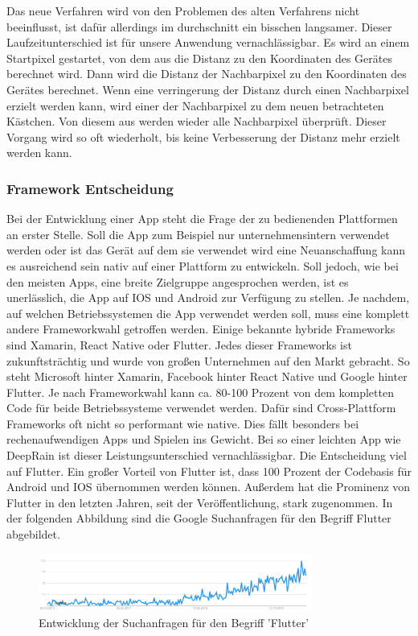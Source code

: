  \noindent 
 Das neue Verfahren wird von den Problemen des alten Verfahrens nicht beeinflusst, ist dafür allerdings im durchschnitt ein bisschen langsamer. 
 Dieser Laufzeitunterschied ist für unsere Anwendung vernachlässigbar. 
 Es wird an einem Startpixel gestartet, von dem aus die Distanz zu den Koordinaten des Gerätes berechnet wird. 
 Dann wird die Distanz der Nachbarpixel zu den Koordinaten des Gerätes berechnet. 
 Wenn eine verringerung der Distanz durch einen Nachbarpixel erzielt werden kann, wird einer der Nachbarpixel zu dem neuen betrachteten Kästchen. 
 Von diesem aus werden wieder alle Nachbarpixel überprüft. 
 Dieser Vorgang wird so oft wiederholt, bis keine Verbesserung der Distanz mehr erzielt werden kann.

\subsubsection{Framework Entscheidung}\label{framework entscheidung}
Bei der Entwicklung einer App steht die Frage der zu bedienenden Plattformen an erster Stelle. Soll die App zum Beispiel nur unternehmensintern verwendet 
werden oder ist das Gerät auf dem sie verwendet wird eine Neuanschaffung kann es ausreichend sein nativ auf einer Plattform zu entwickeln. Soll jedoch, 
wie bei den meisten Apps, eine breite Zielgruppe angesprochen werden, ist es unerlässlich, die App auf IOS und Android zur Verfügung zu stellen. 
Je nachdem, auf welchen Betriebssystemen die App verwendet werden soll, muss eine komplett andere Frameworkwahl getroffen werden. 
Einige bekannte hybride Frameworks sind Xamarin, React Native oder Flutter. Jedes dieser Frameworks ist zukunftsträchtig und wurde von großen 
Unternehmen auf den Markt gebracht. So steht Microsoft hinter Xamarin, Facebook hinter React Native und Google hinter Flutter. 
Je nach Frameworkwahl kann ca. 80-100 Prozent von dem kompletten Code für beide Betriebssysteme verwendet werden. 
Dafür sind Cross-Plattform Frameworks oft nicht so performant wie native. Dies fällt besonders bei rechenaufwendigen Apps und Spielen ins Gewicht. 
Bei so einer leichten App wie DeepRain ist dieser Leistungsunterschied vernachlässigbar.
Die Entscheidung viel auf Flutter.
Ein großer Vorteil von Flutter ist, dass 100 Prozent der Codebasis für Android und IOS übernommen werden können. Außerdem hat die Prominenz von 
Flutter in den letzten Jahren, seit der Veröffentlichung, stark zugenommen. In der folgenden Abbildung sind die Google Suchanfragen für den Begriff 
Flutter abgebildet. 
\begin{figure}[H]
 \centering
 \includegraphics[width=0.8\textwidth,angle=0]{abb/flutter_google_trends}
 \caption[Entwicklung von Flutter]{Entwicklung der Suchanfragen für den Begriff 'Flutter'\cite{GoogleTrends}}
\label{fig:flutter_google_trends}
\end{figure}

